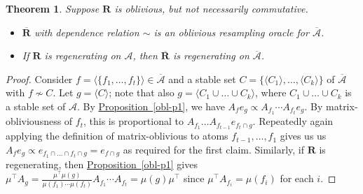 \documentclass[11pt]{article}
\newcommand{\expref}[2]{\texorpdfstring{\hyperref[#2]{#1~\ref{#2}}}{#1~\ref{#2}}}
\newtheorem{theorem}{Theorem}[section]
\newcommand\oa{\overline{\mathcal A}}
\newcommand\obr{\overline{\mathbf R}}
\begin{document}
\begin{theorem}
  Suppose  $\mathbf R$  is oblivious, but not necessarily commutative. 
  \begin{itemize}
  \item $\obr$ with dependence relation $\sim$ is an oblivious resampling oracle for $\oa$.
  \item If $\mathbf R$  is regenerating on $\mathcal A$, then $\obr$ is regenerating on $\oa$.
  \end{itemize}
\end{theorem}
\begin{proof}
Consider $f = \langle \{ f_1, \dots, f_t \} \rangle \in \oa$ and a stable set $C = \{ \langle C_1 \rangle, \dots, \langle C_k \rangle \}$ of $\oa$ with $f \not \sim C$. Let $g = \langle C \rangle$; note that also $g = \langle C_1 \cup \dots \cup C_k \rangle$, where $C_1 \cup \dots \cup C_k$ is a stable set of $\mathcal A$.  By \expref{Proposition}{obl-p1}, we have $A_f e_g \propto A_{f_1} \cdots A_{f_t} e_g$. By matrix-obliviousness of $f_t$, this is proportional to $A_{f_1} \dots A_{f_{t-1}} e_{f_t \cap g}$. Repeatedly again applying the definition of matrix-oblivious to atoms $f_{t-1}, \dots, f_1$ gives us us $A_f e_g \propto e_{f_1 \cap \dots \cap f_t  \cap g} = e_{f \cap g}$ as required for the first claim. Similarly, if $\mathbf R$ is regenerating, then \expref{Proposition}{obl-p1} gives $
\mu^{\top} A_g = \frac{ \mu^{\top} \mu(g) }{\mu(f_1) \cdots \mu(f_t)} A_{f_1} \cdots A_{f_t} = \mu(g) \mu^{\top}
$
since $\mu^{\top} A_{f_i} = \mu(f_i)$ for each $i$.
\end{proof}
  
\end{document}
